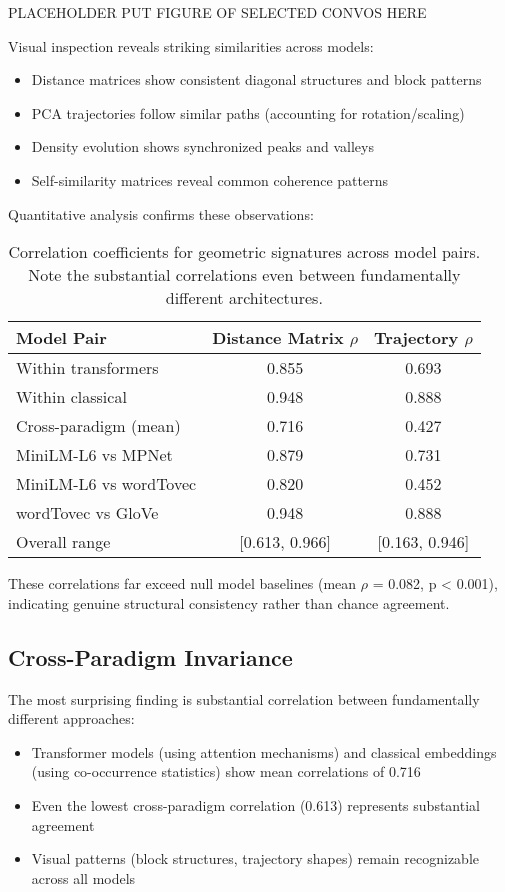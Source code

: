 \documentclass[11pt,letterpaper]{article}
\newcommand{\distanceCorrRange}{[0.613, 0.966]}
\newcommand{\minPairwiseCorr}{0.613}
\newcommand{\transformerInternalCorr}{0.855}
\newcommand{\classicalInternalCorr}{0.948}
\newcommand{\crossParadigmCorr}{0.716}
\newcommand{\miniLMmpnetCorr}{0.879}
\newcommand{\miniLMwordTovecCorr}{0.820}
\newcommand{\wordTovecGloveCorr}{0.948}
\newcommand{\nullModelPValue}{0.001}
\newcommand{\nullBaselineCorr}{0.082}
\begin{document}
PLACEHOLDER PUT FIGURE OF SELECTED CONVOS HERE

Visual inspection reveals striking similarities across models:
\begin{itemize}
\item Distance matrices show consistent diagonal structures and block patterns
\item PCA trajectories follow similar paths (accounting for rotation/scaling)
\item Density evolution shows synchronized peaks and valleys
\item Self-similarity matrices reveal common coherence patterns
\end{itemize}

Quantitative analysis confirms these observations:

\begin{table}[h]
\centering
\begin{tabular}{lcc}
\toprule
Model Pair & Distance Matrix $\rho$ & Trajectory $\rho$ \\
\midrule
Within transformers & \transformerInternalCorr{} & 0.693 \\
Within classical & \classicalInternalCorr{} & 0.888 \\
Cross-paradigm (mean) & \crossParadigmCorr{} & 0.427 \\
\midrule
MiniLM-L6 vs MPNet & \miniLMmpnetCorr{} & 0.731 \\
MiniLM-L6 vs wordTovec & \miniLMwordTovecCorr{} & 0.452 \\
wordTovec vs GloVe & \wordTovecGloveCorr{} & 0.888 \\
\midrule
Overall range & \distanceCorrRange{} & [0.163, 0.946] \\
\bottomrule
\end{tabular}
\caption{Correlation coefficients for geometric signatures across model pairs. Note the substantial correlations even between fundamentally different architectures.}
\label{tab:correlations}
\end{table}

These correlations far exceed null model baselines (mean $\rho$ = \nullBaselineCorr{}, p < \nullModelPValue{}), indicating genuine structural consistency rather than chance agreement.

\subsection{Cross-Paradigm Invariance}

The most surprising finding is substantial correlation between fundamentally different approaches:
\begin{itemize}
\item Transformer models (using attention mechanisms) and classical embeddings (using co-occurrence statistics) show mean correlations of \crossParadigmCorr{}
\item Even the lowest cross-paradigm correlation (\minPairwiseCorr{}) represents substantial agreement
\item Visual patterns (block structures, trajectory shapes) remain recognizable across all models
\end{itemize}
\end{document}
